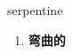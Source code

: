 
\begin{frame}
{\huge serpentine}
\begin{center}
\begin{enumerate}\Large
  \item \textbf{弯曲的}
\end{enumerate}
\end{center}
\end{frame}
